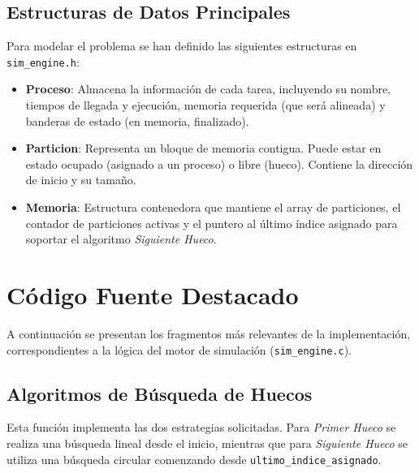 \documentclass[11pt,a4paper]{article}
\begin{document}
\subsection{Estructuras de Datos Principales}

Para modelar el problema se han definido las siguientes estructuras en \texttt{sim\_engine.h}:

\begin{itemize}
    \item \textbf{Proceso}: Almacena la información de cada tarea, incluyendo su nombre, tiempos de llegada y ejecución, memoria requerida (que será alineada)
    y banderas de estado (en memoria, finalizado).
    \item \textbf{Particion}: Representa un bloque de memoria contigua. Puede estar en estado ocupado (asignado a un proceso) o libre (hueco). Contiene la 
    dirección de inicio y su tamaño.
    \item \textbf{Memoria}: Estructura contenedora que mantiene el array de particiones, el contador de particiones activas y el puntero al último índice
    asignado para soportar el algoritmo \textit{Siguiente Hueco}.
\end{itemize}

\newpage

\section{Código Fuente Destacado}

A continuación se presentan los fragmentos más relevantes de la implementación, correspondientes a la lógica del motor de simulación (\texttt{sim\_engine.c}).

\subsection{Algoritmos de Búsqueda de Huecos}

Esta función implementa las dos estrategias solicitadas. Para \textit{Primer Hueco} se realiza una búsqueda lineal desde el inicio, mientras que para \textit{Siguiente Hueco} se utiliza una búsqueda circular comenzando desde \texttt{ultimo\_indice\_asignado}.
\end{document}
